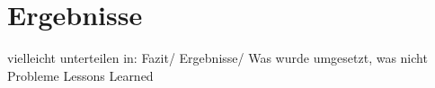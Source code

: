 \section{Ergebnisse}

vielleicht unterteilen in:
Fazit/ Ergebnisse/ Was wurde umgesetzt, was nicht
Probleme
Lessons Learned